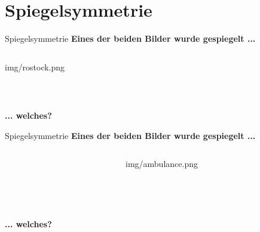 \section{Spiegelsymmetrie}

\begin{frame}{Spiegelsymmetrie}
    \centering
    \textbf{Eines der beiden Bilder wurde gespiegelt ...}
    \vspace*{.5cm}

	\begin{columns}[T]
		\begin{column}{.5\textwidth}
			\centering
			\begin{overpic}[width=\textwidth]{img/rostock.png}
			\end{overpic}\\
		\end{column}
		\begin{column}{.5\textwidth}
			\centering
            \\
		\end{column}
	\end{columns}
    \hfill \textbf{... welches?}
\end{frame}

\begin{frame}{Spiegelsymmetrie}
    \centering
    \textbf{Eines der beiden Bilder wurde gespiegelt ...}
    \vspace*{.5cm}

	\begin{columns}[T]
		\begin{column}{.5\textwidth}
			\centering
            \\
		\end{column}
		\begin{column}{.5\textwidth}
			\centering
			\begin{overpic}[width=\textwidth,trim=10 0 10 0,clip]{img/ambulance.png}
			\end{overpic}\\
		\end{column}
	\end{columns}
    \\
    \hfill \textbf{... welches?}
\end{frame}

